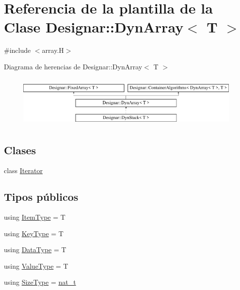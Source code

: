 \hypertarget{class_designar_1_1_dyn_array}{}\section{Referencia de la plantilla de la Clase Designar\+:\+:Dyn\+Array$<$ T $>$}
\label{class_designar_1_1_dyn_array}


{\ttfamily \#include $<$array.\+H$>$}

Diagrama de herencias de Designar\+:\+:Dyn\+Array$<$ T $>$\begin{figure}[H]
\begin{center}
\leavevmode
\includegraphics[height=2.641510cm]{class_designar_1_1_dyn_array}
\end{center}
\end{figure}
\subsection*{Clases}
\begin{DoxyCompactItemize}
\item 
class \hyperlink{class_designar_1_1_dyn_array_1_1_iterator}{Iterator}
\end{DoxyCompactItemize}
\subsection*{Tipos públicos}
\begin{DoxyCompactItemize}
\item 
using \hyperlink{class_designar_1_1_dyn_array_af4ff8919b3ae0778aa749130ee0e35f7}{Item\+Type} = T
\item 
using \hyperlink{class_designar_1_1_dyn_array_a80080a85ac9ccbe95c17bc0c665e70b4}{Key\+Type} = T
\item 
using \hyperlink{class_designar_1_1_dyn_array_aa683f9cc296f4597784541837e234d83}{Data\+Type} = T
\item 
using \hyperlink{class_designar_1_1_dyn_array_a1df36ad5f778935dcd565138afc155a4}{Value\+Type} = T
\item 
using \hyperlink{class_designar_1_1_dyn_array_a830e5247348d7d54c65d25f77ecc74bb}{Size\+Type} = \hyperlink{namespace_designar_aa72662848b9f4815e7bf31a7cf3e33d1}{nat\+\_\+t}
\end{DoxyCompactItemize}
